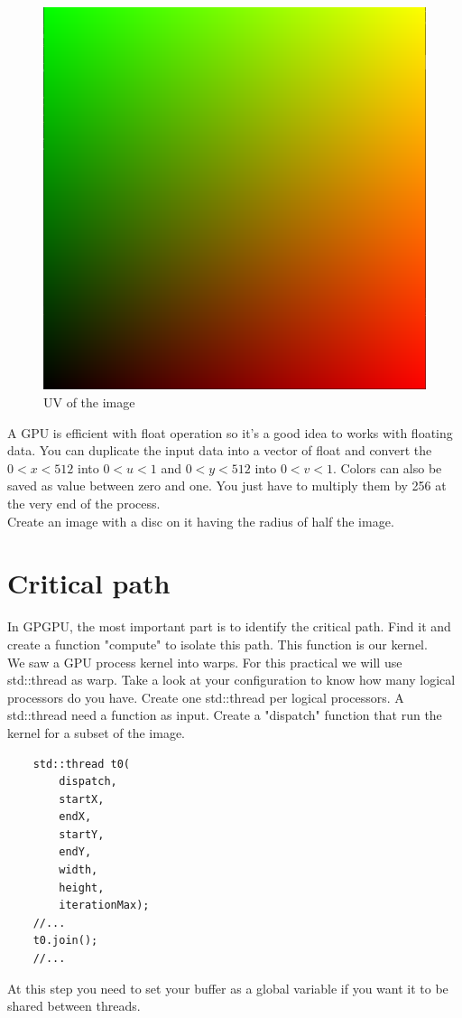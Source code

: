 \documentclass{article}
\begin{document}
\begin{figure}[H]
	\centering
	\includegraphics[scale=0.3]{figures/uv.png}
	\caption{UV of the image}
\end{figure}

A GPU is efficient with float operation so it's a good idea to works with floating data. You can duplicate the input data into a vector of float and convert the $0<x<512$ into $0<u<1$ and $0<y<512$ into $0<v<1$. Colors can also be saved as value between zero and one. You just have to multiply them by 256 at the very end of the process.\\
Create an image with a disc on it having the radius of half the image.

\section{Critical path}
In GPGPU, the most important part is to identify the critical path. Find it and create a function "compute" to isolate this path. This function is our kernel.\\
We saw a GPU process kernel into warps. For this practical we will use std::thread as warp. Take a look at your configuration to know how many logical processors do you have. Create one std::thread per logical processors. A std::thread need a function as input. Create a "dispatch" function that run the kernel for a subset of the image. 
\begin{lstlisting}
	std::thread t0(
		dispatch,
		startX,
		endX,
		startY,
		endY,
		width,
		height,
		iterationMax);
	//...
	t0.join();
	//...
\end{lstlisting}
At this step you need to set your buffer as a global variable if you want it to be shared between threads.
\end{document}

